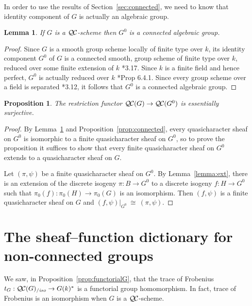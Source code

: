 \documentclass[11pt]{amsart}
\theoremstyle{plain}
\newtheorem{proposition}[theorem]{Proposition}
\newtheorem{lemma}[theorem]{Lemma}
\theoremstyle{definition}
\theoremstyle{remark}
\newcommand{\Fq}{k}
\newcommand{\iso}{{\ \cong\ }}
\newcommand{\QC}{{\mathcal{Q\hskip-0.8pt C}}}
\newcommand{\QCiso}[1]{\QC(#1)_{/\textit{iso}}}
\newcommand{\trFrob}[1]{t_{#1}}
\begin{document}
In order to use the results of Section~\ref{sec:connected}, we need to know that
identity component of $G$ is actually an algebraic group.

\begin{lemma} \label{lem:G0alg-grp}
If $G$ is a $\QC$-scheme then $G^0$ is a connected algebraic group.
\end{lemma}
\begin{proof}
 Since $G$ is a smooth group scheme locally of finite type over $\Fq$, its
 identity component $G^0$ of $G$ is a connected smooth, 
 group scheme of finite type over $\Fq$, reduced over some finite extension of $\Fq$
 \cite{vdGeer-Moonen:AbelianVarieties}*{3.17}. 
 Since $\Fq$ is a finite field and hence perfect, $G^0$ is actually reduced over $\Fq$
 \cite{EGAIV2}*{Prop 6.4.1}.  Since every group scheme over a field is separated 
 \cite{vdGeer-Moonen:AbelianVarieties}*{3.12},
 it follows that $G^0$ is a connected algebraic group.
\end{proof}

\begin{proposition}\label{prop:restriction}
  The restriction functor $\QC(G)\to \QC(G^0)$ is essentially surjective.
\end{proposition}

\begin{proof}
  By Lemma~\ref{lem:G0alg-grp} and Proposition~\ref{prop:connected}, every
  quasicharacter sheaf on $G^0$ is isomorphic to a 
  finite quasicharacter sheaf on $G^0$, 
  so to prove the proposition it suffices to show that every 
  finite quasicharacter sheaf on $G^0$ extends to a quasicharacter sheaf on $G$.
  
 Let $(\pi,\psi)$ be a finite quasicharacter sheaf on $G^0$.
 By Lemma~\ref{lemma:ext}, there is an extension of the 
 discrete isogeny $\pi : B \to G^0$ to a discrete isogeny $f : H \to G^0$ 
 such that $\pi_0(f) : \pi_0(H)\to \pi_0(G)$ is an isomorphism.
 Then $(f,\psi)$ is a finite quasicharacter sheaf on $G$ and 
 $(f,\psi)\vert_{G^0} \iso (\pi,\psi)$.
\end{proof}

\section{The sheaf--function dictionary for non-connected groups}
\label{sec:snake}

We saw, in Proposition~\ref{prop:functorialG}, that the trace of Frobenius
$\trFrob{G} : \QCiso{G} \to G(\Fq)^*$ is a functorial group homomorphism.
In fact, trace of Frobenius is an isomorphism when $G$ is a $\QC$-scheme.
\end{document}
